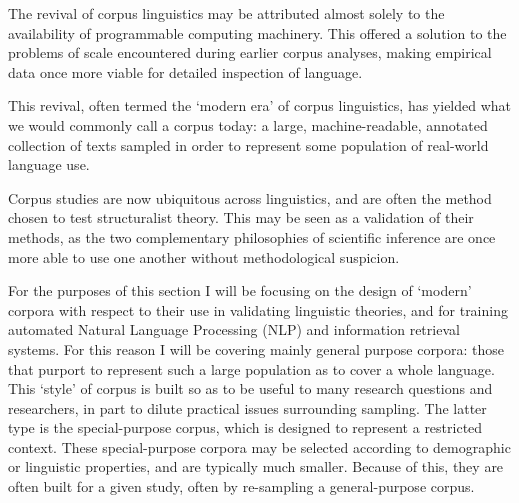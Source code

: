 The revival of corpus linguistics may be attributed almost solely to the availability of programmable computing machinery.  This offered a solution to the problems of scale encountered during earlier corpus analyses, making empirical data once more viable for detailed inspection of language.

This revival, often termed the `modern era' of corpus linguistics, has yielded what we would commonly call a corpus today: a large, machine-readable, annotated collection of texts sampled in order to represent some population of real-world language use.

Corpus studies are now ubiquitous across linguistics, and are often the method chosen to test structuralist theory.  This may be seen as a validation of their methods, as the two complementary philosophies of scientific inference are once more able to use one another without methodological suspicion.

For the purposes of this section I will be focusing on the design of `modern' corpora with respect to their use in validating linguistic theories, and for training automated Natural Language Processing (NLP) and information retrieval systems.  For this reason I will be covering mainly general purpose corpora: those that purport to represent such a large population as to cover a whole language.  This `style' of corpus is built so as to be useful to many research questions and researchers, in part to dilute practical issues surrounding sampling.  The latter type is the special-purpose corpus, which is designed to represent a restricted context.  These special-purpose corpora may be selected according to demographic or linguistic properties, and are typically much smaller.  Because of this, they are often built for a given study, often by re-sampling a general-purpose corpus.









